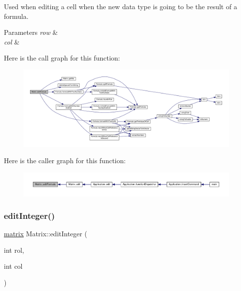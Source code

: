 Used when editing a cell when the new data type is going to be the result of a formula. 
\begin{DoxyParams}{Parameters}
{\em row} & \\
\hline
{\em col} & \\
\hline
\end{DoxyParams}
Here is the call graph for this function\+:\nopagebreak
\begin{figure}[H]
\begin{center}
\leavevmode
\includegraphics[width=350pt]{class_matrix_af3d26e46fcec1a98380b1af04f008f22_cgraph}
\end{center}
\end{figure}
Here is the caller graph for this function\+:\nopagebreak
\begin{figure}[H]
\begin{center}
\leavevmode
\includegraphics[width=350pt]{class_matrix_af3d26e46fcec1a98380b1af04f008f22_icgraph}
\end{center}
\end{figure}
\mbox{\label{class_matrix_a91c66e2961a16adf56b8d58b916d2d46}} 
\subsubsection{\texorpdfstring{edit\+Integer()}{editInteger()}}
{\footnotesize\ttfamily \hyperlink{formula_8h_a869e2a5deeb3daa4c82d6bc91cf20d92}{matrix} Matrix\+::edit\+Integer (\begin{DoxyParamCaption}\item[{int}]{rol,  }\item[{int}]{col }\end{DoxyParamCaption})\hspace{0.3cm}{\ttfamily [private]}}

